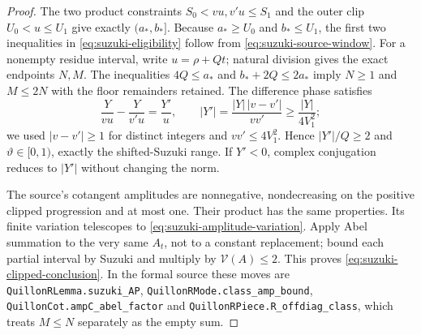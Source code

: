 \documentclass[11pt]{article}
\theoremstyle{definition}
\theoremstyle{remark}
\newcommand{\1}{\mathbf 1}
\begin{document}
\begin{proof}
The two product constraints $S_0<vu,v'u\le S_1$ and the
outer clip $U_0<u\le U_1$ give exactly $(a_*,b_*]$.
Because $a_*\ge U_0$ and $b_*\le U_1$, the first two
inequalities in \eqref{eq:suzuki-eligibility} follow from
\eqref{eq:suzuki-source-window}. For a nonempty residue interval,
write $u=\rho+Qt$; natural division gives the exact endpoints
$N,M$. The inequalities $4Q\le a_*$ and
$b_*+2Q\le2a_*$ imply $N\ge1$ and $M\le2N$
with the floor remainders retained. The difference phase satisfies
\[
 \frac{Y}{vu}-\frac{Y}{v'u}=\frac{Y'}{u},\qquad
 |Y'|=\frac{|Y|\,|v-v'|}{vv'}
       \ge\frac{|Y|}{4V_1^2};
\]
we used $|v-v'|\ge1$ for distinct integers and
$vv'\le4V_1^2$. Hence $|Y'|/Q\ge2$ and
$\vartheta\in[0,1)$, exactly the shifted-Suzuki
range. If $Y'<0$, complex conjugation reduces to $|Y'|$
without changing the norm.

The source's cotangent amplitudes are nonnegative,
nondecreasing on the positive clipped progression and at most
one. Their product has the same properties. Its finite
variation telescopes to \eqref{eq:suzuki-amplitude-variation}.
Apply Abel summation to the very same $A_t$, not to a constant
replacement; bound each partial interval by Suzuki and
multiply by $\mathcal V(A)\le2$. This proves
\eqref{eq:suzuki-clipped-conclusion}. In the formal source these
moves are \texttt{QuillonRLemma.suzuki\_AP},
\texttt{QuillonRMode.class\_amp\_bound},
\texttt{QuillonCot.ampC\_abel\_factor} and
\texttt{QuillonRPiece.R\_offdiag\_class}, which treats
$M\le N$ separately as the empty sum.
\end{proof}
\end{document}
